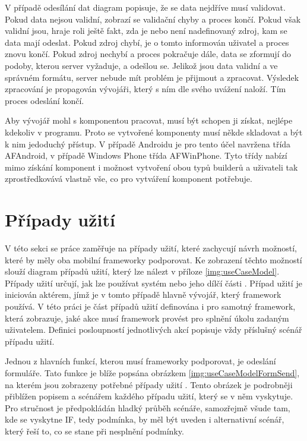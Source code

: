 V případě odesílání dat diagram popisuje, že se data nejdříve musí validovat. Pokud data nejsou validní, zobrazí se validační chyby a proces končí. Pokud však validní jsou, hraje roli ještě fakt, zda je nebo není nadefinovaný zdroj, kam se data mají odeslat. Pokud zdroj chybí, je o tomto informován uživatel a proces znovu končí. Pokud zdroj nechybí a proces pokračuje dále, data se zformují do podoby, kterou server vyžaduje, a odešlou se. Jelikož jsou data validní a ve správném formátu, server nebude mít problém je přijmout a zpracovat. Výsledek zpracování je propagován vývojáři, který s ním dle svého uvážení naloží. Tím proces odeslání končí. 

Aby vývojář mohl s komponentou pracovat, musí být schopen ji získat, nejlépe kdekoliv v programu. Proto se vytvořené komponenty musí někde skladovat a být k nim jedoduchý přístup. V případě Androidu je pro tento účel navržena třída AFAndroid, v případě Windows Phone třída AFWinPhone. Tyto třídy nabízí mimo získání komponent i možnost vytvoření obou typů builderů a uživateli tak zprostředkovává vlastně vše, co pro vytváření komponent potřebuje.

\section{Případy užití}
V této sekci se práce zaměřuje na případy užití, které zachycují návrh možností, které by měly oba mobilní frameworky podporovat. Ke zobrazení těchto možností slouží diagram případů užití, který lze nálezt v příloze \ref{img:useCaseModel}. Případy užití určují, jak lze používat systém nebo jeho dílčí části \cite{UmlArlow}. Případ užití je iniciován aktérem, jímž je v tomto případě hlavně vývojář, který framework používá. V této práci je část případů užití definována i pro samotný framework, která zobrazuje, jaké akce musí framework provést pro splnění úkolu zadaným uživatelem. Definici posloupností jednotlivých akcí popisuje vždy příslušný scénář případu užití. 

Jednou z hlavních funkcí, kterou musí frameworky podporovat, je odeslání formuláře. Tato funkce je blíže popsána obrázkem \ref{img:useCaseModelFormSend}, na kterém jsou zobrazeny potřebné případy užití \cite{tomasek-thesis}. Tento obrázek je podrobněji přiblížen popisem a scénářem každého případu užití, který se v něm vyskytuje. Pro stručnost je předpokládán hladký průběh scénáře, samozřejmě všude tam, kde se vyskytne IF, tedy podmínka, by měl být uveden i alternativní scénář, který řeší to, co se stane při nesplnění podmínky.

